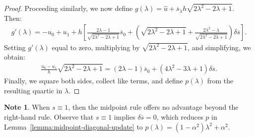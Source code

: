 \documentclass{article}
\theoremstyle{definition}
\newtheorem{note}{Note}
\begin{document}
\begin{proof}
  Proceeding similarly, we now define
  $g(\lambda) = \hat{u} + \overline{s}_\lambda h \sqrt{2 \lambda^2 -
    2\lambda + 1}$. Then:
  \begin{align*}
    g'(\lambda) = -u_0 + u_1 + h \left[\frac{2\lambda - 1}{\sqrt{2\lambda^2 - 2\lambda + 1}} \overline{s}_0 + \left(\sqrt{2\lambda^2 - 2\lambda + 1} + \frac{2\lambda^2 - \lambda}{\sqrt{2\lambda^2 - 2\lambda + 1}}\right)\delta \overline{s}\right].
  \end{align*}
  Setting $g'(\lambda)$ equal to zero, multiplying by
  $\sqrt{2\lambda^2 - 2\lambda +1}$, and simplifying, we obtain:
  \begin{align*}
    \frac{u_0 - u_1}{h} \sqrt{2\lambda^2 - 2\lambda + 1} = {(2\lambda - 1)}\overline{s}_0 + {(4\lambda^2 - 3\lambda + 1)} \delta \overline{s}.
  \end{align*}
  Finally, we square both sides, collect like terms, and define
  $p(\lambda)$ from the resulting quartic in $\lambda$.
\end{proof}

\begin{note}
  When $s \equiv 1$, then the midpoint rule offers no advantage beyond
  the right-hand rule. Observe that $s \equiv 1$ implies
  $\delta \overline{s} = 0$, which reduces $p$ in
  Lemma~\ref{lemma:midpoint-diagonal-update} to
  $p(\lambda) = (1 - \alpha^2) \lambda^2 + \alpha^2$. 
\end{note}
\end{document}
